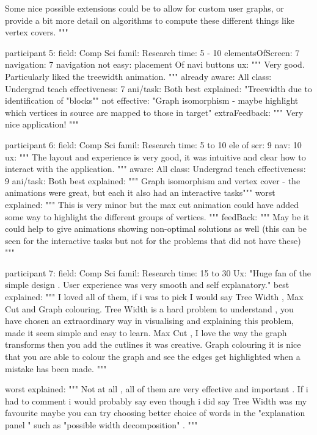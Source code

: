       Some nice possible
      extensions could be to allow for custom user graphs, 
      or provide a bit
      more detail on 
      algorithms to compute these different things like 
      vertex
      covers.
      """

participant 5:
   field: Comp Sci
   famil: Research
   time: 5 - 10
   elementsOfScreen: 7
   navigation: 7
   navigation not easy: placement Of navi buttons
   ux:
      """
      Very good.  Particularly liked the treewidth animation.
      """
   already aware: All
   class: Undergrad
   teach effectiveness: 7
   ani/task: Both
   best explained:
      "Treewidth due to identification of "blocks""
   not effective:
      "Graph isomorphism - maybe highlight which vertices in source are mapped
      to those in target"
   extraFeedback:
      """
      Very nice application!
      """

participant 6:
   field: Comp Sci
   famil: Research
   time: 5 to 10
   ele of scr: 9
   nav: 10
   ux:
      """
      The layout and experience is very good, it was intuitive and clear how to
      interact with the application.
      """
   aware: All
   class: Undergrad
   teach effectiveness: 9
   ani/task: Both
   best explained:
      """
      Graph isomorphism and vertex cover - the animations were great, but
      each it also had an interactive tasks"""
      worst explained:
      """
      This is very minor but the max cut animation could have added some way to
      highlight the different groups of vertices.
      """
   feedBack:
      """
      May be it could help to give animations showing non-optimal solutions as
      well (this can be seen for the interactive tasks but not for the problems
      that did not have these)
      """

participant 7:
   field: Comp Sci
   famil: Research
   time: 15 to 30
   Ux: "Huge fan of the simple design . User experience was very smooth and self explanatory."
   best explained:
      """ I loved all of them, if i was to pick I would say Tree Width , Max
      Cut and Graph colouring. Tree Width is a hard problem to understand , you
      have chosen an extraordinary way in visualising and explaining this
      problem, made it seem simple and easy to learn. Max Cut , I love the way
      the graph transforms then you add the cutlines it was creative. Graph
      colouring it is nice that you are able to colour the graph and see the
      edges get highlighted when a mistake has been made.  """
   
   worst explained:
      """
      Not at all , all of them are very effective and important . If i had to
      comment i would probably say even though i did say Tree Width was my
      favourite maybe you can try choosing better choice of words in the
      "explanation panel " such as "possible width decomposition" .
      """

